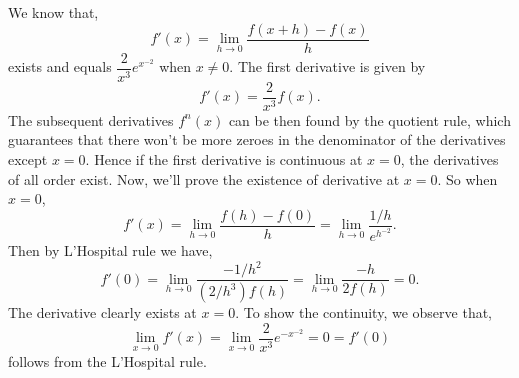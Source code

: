 \begin{solution}
    We know that,
    $$f'(x)=\lim_{h\to 0}{
        \frac{f(x+h)-f(x)}{h}
    }$$
    exists and equals $\dfrac{2}{x^3}
    e^{x^{-2}}$ when $x\ne 0$. The
    first derivative is given by
    $$f'(x)=\dfrac{2}{x^3}f(x).$$
    The subsequent derivatives $f^n(x)
    $ can be then found by the
    quotient rule, which guarantees
    that there won't be more zeroes
    in the denominator
    of the derivatives except $x=0$.
    Hence if the first
    derivative is continuous at $x=0$,
    the derivatives of all order exist.
    Now, we'll prove the existence
    of derivative at $x=0$. 
    So when $x=0$,
    $$f'(x)=\lim_{h\to 0}{\frac{
        f(h)-f(0)
    }{h}}=
    \lim_{h\to 0}{
        \frac{1/h}{e^{h^{-2}}}}.$$
    Then by L'Hospital rule we have,
    $$f'(0)=\lim_{h\to 0}{\frac{
        -1/h^2
    }{(2/h^3)f(h)}}=
    \lim_{h\to 0}{\frac{-h}{2f(h)}}
    =0.$$
    The derivative clearly exists at
    $x=0$. To show the continuity, we
    observe that,
    $$\lim_{x\to 0}{f'(x)}=
    \lim_{x\to 0}{\frac{2}{x^3}e^{-x^
    {-2}}}=0=f'(0)$$
    follows from the L'Hospital rule.
    
\end{solution}